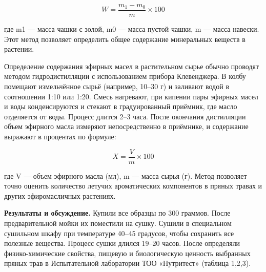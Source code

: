 \begin{multicols}{2}
\[W = \frac{m_1 - m_0}{m} \times 100\]

где m1 --- масса чашки с золой, m0 --- масса пустой чашки, m --- масса
навески. Этот метод позволяет определить общее содержание минеральных
веществ в растении.

Определение содержания эфирных масел в растительном сырье обычно
проводят методом гидродистилляции с использованием прибора Клевенджера.
В колбу помещают измельчённое сырьё (например, 10--30 г) и заливают
водой в соотношении 1:10 или 1:20. Смесь нагревают, при кипении пары
эфирных масел и воды конденсируются и стекают в градуированный приёмник,
где масло отделяется от воды. Процесс длится 2--3 часа. После окончания
дистилляции объем эфирного масла измеряют непосредственно в приёмнике, и
содержание выражают в процентах по формуле:

\[X = \frac{V}{m} \times 100\]

где V --- объем эфирного масла (мл), m --- масса сырья (г). Метод
позволяет точно оценить количество летучих ароматических компонентов в
пряных травах и других эфиромасличных растениях.

{\bfseries Результаты и обсуждение.} Купили все образцы по 300 граммов.
После предварительной мойки их поместили на сушку. Сушили в специальном
сушильном шкафу при температуре 40--45 градусов, чтобы сохранить все
полезные вещества. Процесс сушки длился 19--20 часов. После определяли
физико-химические свойства, пищевую и биологическую ценность выбранных
пряных трав в Испытательной лаборатории ТОО «Нутритест» (таблица 1,2,3).
\end{multicols}


